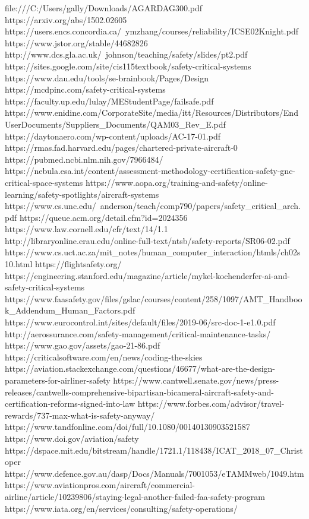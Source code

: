 file:///C:/Users/gally/Downloads/AGARDAG300.pdf
https://arxiv.org/abs/1502.02605
https://users.encs.concordia.ca/~ymzhang/courses/reliability/ICSE02Knight.pdf
https://www.jstor.org/stable/44682826
http://www.dcs.gla.ac.uk/~johnson/teaching/safety/slides/pt2.pdf
https://sites.google.com/site/cis115textbook/safety-critical-systems
https://www.dau.edu/tools/se-brainbook/Pages/Design%
https://mcdpinc.com/safety-critical-systems
https://faculty.up.edu/lulay/MEStudentPage/failsafe.pdf
https://www.enidine.com/CorporateSite/media/itt/Resources/Distributors/EndUserDocuments/Suppliers_Documents/QAM03_Rev_E.pdf
https://daytonaero.com/wp-content/uploads/AC-17-01.pdf
https://rmas.fad.harvard.edu/pages/chartered-private-aircraft-0
https://pubmed.ncbi.nlm.nih.gov/7966484/
https://nebula.esa.int/content/assessment-methodology-certification-safety-gnc-critical-space-systems
https://www.aopa.org/training-and-safety/online-learning/safety-spotlights/aircraft-systems
https://www.cs.unc.edu/~anderson/teach/comp790/papers/safety_critical_arch.pdf
https://queue.acm.org/detail.cfm?id=2024356
https://www.law.cornell.edu/cfr/text/14/1.1
http://libraryonline.erau.edu/online-full-text/ntsb/safety-reports/SR06-02.pdf
https://www.cs.uct.ac.za/mit_notes/human_computer_interaction/htmls/ch02s10.html
https://flightsafety.org/
https://engineering.stanford.edu/magazine/article/mykel-kochenderfer-ai-and-safety-critical-systems
https://www.faasafety.gov/files/gslac/courses/content/258/1097/AMT_Handbook_Addendum_Human_Factors.pdf
https://www.eurocontrol.int/sites/default/files/2019-06/src-doc-1-e1.0.pdf
http://aerossurance.com/safety-management/critical-maintenance-tasks/
https://www.gao.gov/assets/gao-21-86.pdf
https://criticalsoftware.com/en/news/coding-the-skies
https://aviation.stackexchange.com/questions/46677/what-are-the-design-parameters-for-airliner-safety
https://www.cantwell.senate.gov/news/press-releases/cantwells-comprehensive-bipartisan-bicameral-aircraft-safety-and-certification-reforms-signed-into-law
https://www.forbes.com/advisor/travel-rewards/737-max-what-is-safety-anyway/
https://www.tandfonline.com/doi/full/10.1080/00140130903521587
https://www.doi.gov/aviation/safety
https://dspace.mit.edu/bitstream/handle/1721.1/118438/ICAT_2018_07_Christoper%
https://www.defence.gov.au/dasp/Docs/Manuals/7001053/eTAMMweb/1049.htm
https://www.aviationpros.com/aircraft/commercial-airline/article/10239806/staying-legal-another-failed-faa-safety-program
https://www.iata.org/en/services/consulting/safety-operations/
